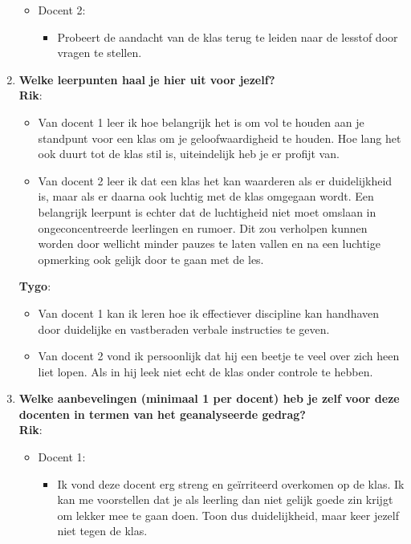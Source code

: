 \documentclass{article}
\begin{document}
\begin{enumerate}[label=(\alph*)]
\begin{itemize}
                \item Docent 2:
                    \begin{itemize}
                        \item Probeert de aandacht van de klas terug te leiden naar de lesstof door vragen te stellen.
                    \end{itemize}
            \end{itemize}
        \item \textbf{Welke leerpunten haal je hier uit voor jezelf?} \\
        \textbf {Rik}: 
            \begin{itemize}
                \item Van docent 1 leer ik hoe belangrijk het is om vol te houden aan je standpunt voor een klas om je geloofwaardigheid te houden. Hoe lang het ook duurt tot de klas stil is, uiteindelijk heb je er profijt van.
                \item Van docent 2 leer ik dat een klas het kan waarderen als er duidelijkheid is, maar als er daarna ook luchtig met de klas omgegaan wordt. Een belangrijk leerpunt is echter dat de luchtigheid niet moet omslaan in ongeconcentreerde leerlingen en rumoer. Dit zou verholpen kunnen worden door wellicht minder pauzes te laten vallen en na een luchtige opmerking ook gelijk door te gaan met de les.
            \end{itemize}
        \textbf{Tygo}: 
            \begin{itemize}
                \item Van docent 1 kan ik leren hoe ik effectiever discipline kan handhaven door duidelijke en vastberaden verbale instructies te geven.
                \item Van docent 2 vond ik persoonlijk dat hij een beetje te veel over zich heen liet lopen. Als in hij leek niet echt de klas onder controle te hebben.
            \end{itemize}
        \item \textbf{Welke aanbevelingen (minimaal 1 per docent) heb je zelf voor deze docenten in termen van het geanalyseerde gedrag?} \\
        \textbf {Rik}: 
        \begin{itemize}
                \item Docent 1:
                    \begin{itemize}
                        \item Ik vond deze docent erg streng en geïrriteerd overkomen op de klas. Ik kan me voorstellen dat je als leerling dan niet gelijk goede zin krijgt om lekker mee te gaan doen. Toon dus duidelijkheid, maar keer jezelf niet tegen de klas.

\end{itemize}
\end{itemize}
\end{enumerate}
\end{document}
